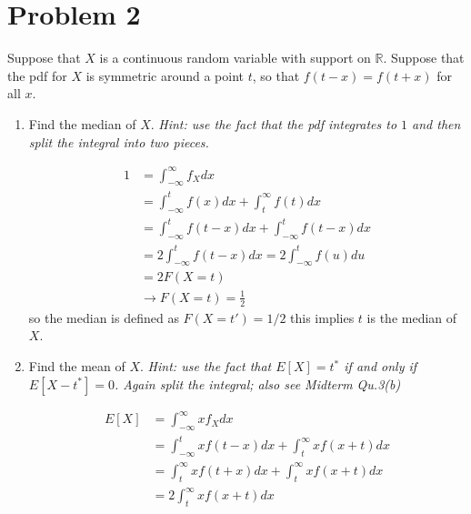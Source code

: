 \documentclass{article}
\newcommand{\1}{\mathbf{1}}
\begin{document}
\section*{Problem 2}
Suppose that $X$ is a continuous random variable with support on $\mathbb{R}$. Suppose that the pdf for $X$ is symmetric around a point $t$, so that $f(t-x) = f(t+x)$ for all $x$.
\begin{enumerate}
    \item Find the median of $X$. {\it Hint: use the fact that the pdf integrates to $1$ and then split the integral into two pieces.}
    
    \begin{align*}
        1 &= \int_{-\infty}^\infty f_X dx \\
        &= \int_{-\infty}^t f(x)dx + \int_t^\infty f(t)dx \\
        &= \int_{-\infty}^t f(t-x)dx + \int_{-\infty}^t f(t-x)dx \\
        &= 2\int_{-\infty}^t f(t-x)dx = 2\int_{-\infty}^t f(u)du \\
        &= 2F(X=t) \\
        &\rightarrow F(X=t) = \frac{1}{2}
    \end{align*}
    so the median is defined as $F(X=t')=1/2$ this implies $t$ is the median of $X$.
    
    \item Find the mean of $X$. {\it Hint: use the fact that $E[X] = t^*$ if and only if $E[X-t^*]=0$. Again split the integral; also see Midterm Qu.3(b)} 
    
    \begin{align*}
        E[X] &= \int_{-\infty}^\infty xf_X dx \\
        &= \int_{-\infty}^t xf(t-x)dx + \int_t^\infty xf(x+t)dx \\
        &= \int_t^\infty xf(t+x)dx + \int_t^\infty xf(x+t)dx \\
        &= 2\int_t^\infty xf(x+t)dx
    \end{align*}
\end{enumerate}



\newpage
\end{document}
